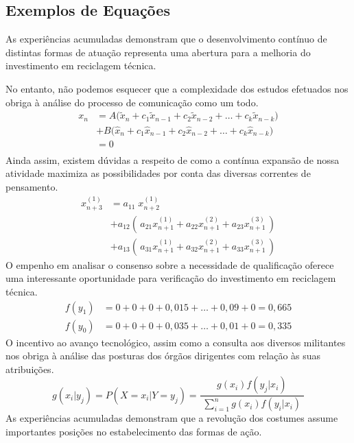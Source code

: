 \begin{apendicesenv}
    \chapter{Exemplos de Equações}
    \label{chap_exemplos_equacoes}

    As experiências acumuladas demonstram que o desenvolvimento contínuo de
    distintas formas de atuação representa uma abertura para a melhoria do
    investimento em reciclagem técnica.

    No entanto, não podemos esquecer que a complexidade dos estudos efetuados nos
    obriga à análise do processo de comunicação como um todo.
    \[
        \begin{split}
            x_n & = A \big( \tilde{x}_n + c_1\tilde{x}_{n-1} + c_2\tilde{x}_{n-2} + \dots + c_k\tilde{x}_{n-k} \big) \\
            & + B \big(   \hat{x}_n + c_1  \hat{x}_{n-1} + c_2  \hat{x}_{n-2} + \dots + c_k  \hat{x}_{n-k} \big) \\
            & = 0 \\
        \end{split}
    \]
    Ainda assim, existem dúvidas a respeito de como a contínua expansão de nossa
    atividade maximiza as possibilidades por conta das diversas correntes de
    pensamento.
    \begin{equation}
        \begin{split}
            x_{n+3}^{(1)} & = a_{11}\; x_{n+2}^{(1)}                                                                  \\[2mm]
            & + a_{12} \left( \, a_{21}x_{n+1}^{(1)}+a_{22}x_{n+1}^{(2)}+a_{23}x_{n+1}^{(3)} \, \right) \\[2mm]
            & + a_{13} \left( \, a_{31}x_{n+1}^{(1)}+a_{32}x_{n+1}^{(2)}+a_{33}x_{n+1}^{(3)} \, \right)
        \end{split}
    \end{equation}
    O empenho em analisar o consenso sobre a necessidade de qualificação oferece uma
    interessante oportunidade para verificação do investimento em reciclagem
    técnica.
    \begin{align*}
        f(y_1) & = 0 + 0 + 0 + 0,015 + \dots + 0,09 + 0 = 0,665 \\
        f(y_0) & = 0 + 0 + 0 + 0,035 + \dots + 0,01 + 0 = 0,335
    \end{align*}
    O incentivo ao avanço tecnológico, assim como a consulta aos diversos militantes nos obriga
    à análise das posturas dos órgãos dirigentes com relação às suas atribuições.
    \[
        g(x_i|y_j) = P(X=x_i|Y=y_j) = \frac{g(x_i) f(y_j|x_i)}{\displaystyle\;\sum_{i=1}^{n} g(x_i) f(y_i|x_i)\;}
    \]
    As experiências acumuladas demonstram que a revolução dos costumes
    assume importantes posições no estabelecimento das formas de ação.


\end{apendicesenv}
